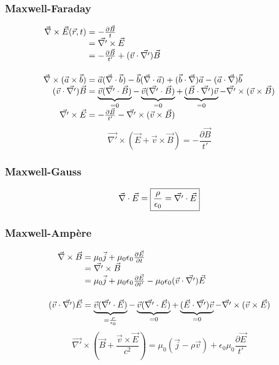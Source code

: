 \subsubsection*{Maxwell-Faraday}
$$
	\begin{array}{r@{\;}l}
		\nab\times\vec{E}(\vec{r},t)&=-\frac{\partial \vec{B}}{t}\\
			&=\vec{\nabla '}\times\vec{E}\\
			&=-\frac{\partial \vec{B}}{t'} + (\vec{v}\cdot\vec{\nabla '})\vec{B}\\[15pt]
		\nab\times(\vec{a}\times\vec{b})&=\vec{a}(\nab\cdot\vec{b})
				-\vec{b}(\nab\cdot\vec{a})
				+(\vec{b}\cdot\nab)\vec{a}
				-(\vec{a}\cdot\nab)\vec{b}\\
		(\vec{v}\cdot\vec{\nabla '})\vec{B}&=\underbrace{\vec{v}(\vec{\nabla '}\cdot\vec{B})}_{=0}
				-\underbrace{\vec{v}(\vec{\nabla '}\cdot\vec{B})}_{=0}
				+\underbrace{(\vec{B}\cdot\vec{\nabla '})\vec{v}}_{=0}
				-\vec{\nabla '}\times(\vec{v}\times\vec{B})\\
		\vec{\nabla '}\times\vec{E}&=-\frac{\partial \vec{B}}{t'}-\vec{\nabla '}\times(\vec{v}\times\vec{B})
	\end{array}
$$
$$
	\boxed{\vec{\nabla '}\times(\vec{E}+\vec{v}\times\vec{B})=-\frac{\partial \vec{B}}{t'}}	
$$
\subsubsection*{Maxwell-Gauss}
$$
	\vec{\nabla}\cdot\vec{E}=\boxed{\frac{\rho}{\epsilon_0}=\vec{\nabla '}\cdot\vec{E}}
$$

\subsubsection*{Maxwell-Ampère}
$$
	\begin{array}{r@{\;}l}
		\nab\times\vec{B}&=\mu_0\vec{j}+\mu_0\epsilon_0\frac{\partial \vec{E}}{\partial t}\\
			&=\vec{\nabla '}\times\vec{B}\\
			&=\mu_0\vec{j}+\mu_0\epsilon_0\frac{\partial \vec{E}}{\partial t'}-\mu_0\epsilon_0(\vec{v}\cdot\vec{\nabla '})\vec{E}\\[15pt]
		(\vec{v}\cdot\vec{\nabla '})\vec{E}&=\underbrace{\vec{v}(\vec{\nabla '}\cdot\vec{E})}_{=\frac{\rho}{\epsilon_0}}
				-\underbrace{\vec{v}(\vec{\nabla '}\cdot\vec{E})}_{=0}
				+\underbrace{(\vec{E}\cdot\vec{\nabla '})\vec{v}}_{=0}
				-\vec{\nabla '}\times(\vec{v}\times\vec{E})
	\end{array}
$$
$$
	\boxed{\vec{\nabla '}\times(\vec{B}+\frac{\vec{v}\times\vec{E}}{c^2})=\mu_0(\vec{j}-\rho\vec{v})+\epsilon_0\mu_0\frac{\partial \vec{E}}{t'}}	
$$

